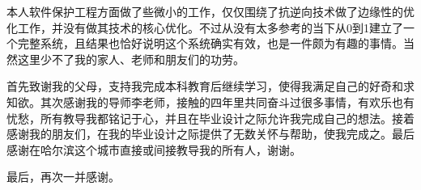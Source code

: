 \begin{acknowledgement}
本人软件保护工程方面做了些微小的工作，仅仅围绕了抗逆向技术做了边缘性的优化工作，并没有做其技术的核心优化。不过从没有太多参考的当下从0到1建立了一个完整系统，且结果也恰好说明这个系统确实有效，也是一件颇为有趣的事情。当然这里少不了我的家人、老师和朋友们的功劳。

首先致谢我的父母，支持我完成本科教育后继续学习，使得我满足自己的好奇和求知欲。其次感谢我的导师李老师，接触的四年里共同奋斗过很多事情，有欢乐也有忧愁，所有教导我都铭记于心，并且在毕业设计之际允许我完成自己的想法。接着感谢我的朋友们，在我的毕业设计之际提供了无数关怀与帮助，使我完成之。最后感谢在哈尔滨这个城市直接或间接教导我的所有人，谢谢。

最后，再次一并感谢。
    
  
\end{acknowledgement}
